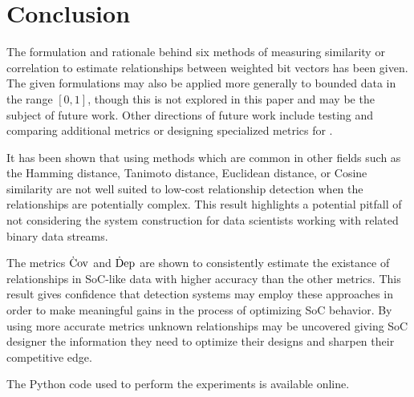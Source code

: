 \documentclass[runningheads]{llncs}
\newcommand*{\ShowReferences}{} %
\begin{document}
\section{Conclusion} %
\label{sec:conclusion}

The formulation and rationale behind six methods of measuring similarity or
correlation to estimate relationships between weighted bit vectors has been
given.
The given formulations may also be applied more generally to bounded data in
the range $[0,1]$, though this is not explored in this paper and may be the
subject of future work.
Other directions of future work include testing and comparing additional metrics
or designing specialized metrics for .

It has been shown that using methods which are common in other fields such as
the Hamming distance, Tanimoto distance, Euclidean distance, or Cosine
similarity are not well suited to low-cost relationship detection when the
relationships are potentially complex.
This result highlights a potential pitfall of not considering the system
construction for data scientists working with related binary data streams.

The metrics $\operatorname{\dot{C}ov}$ and $\operatorname{\dot{D}ep}$ are shown to consistently estimate the existance
of relationships in \gls{SoC}-like data with higher accuracy than the other
metrics.
This result gives confidence that detection systems may employ these approaches
in order to make meaningful gains in the process of optimizing \gls{SoC}
behavior.
By using more accurate metrics unknown relationships may be uncovered giving
\gls{SoC} designer the information they need to optimize their designs and
sharpen their competitive edge.

The Python code used to perform the experiments is available online\cite{relest}.



\ifdefined\ShowReferences
  \newpage
  
  {} %
\fi

\ifdefined\ShowGlossary
  \clearpage
  \printnoidxglossary[sort=letter]
\fi

\end{document}
